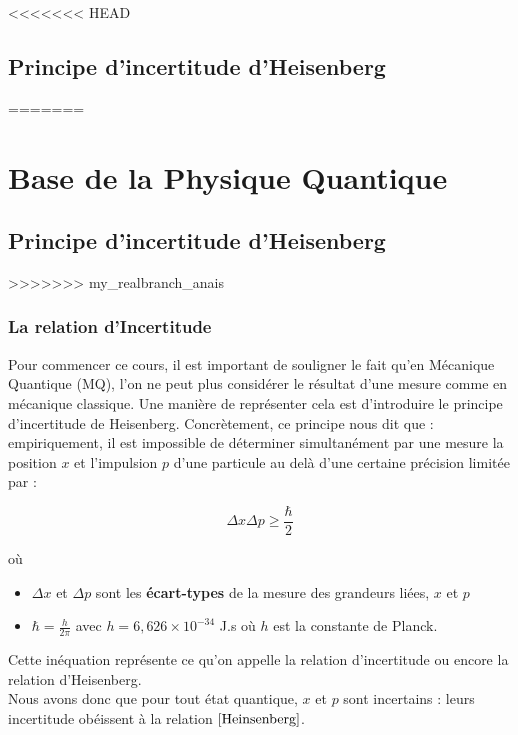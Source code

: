 \documentclass[../Notes de cours]{subfiles}
\begin{document}
<<<<<<< HEAD
\chapter{Principe d'incertitude d'Heisenberg}\label{chap:chap1}
=======
\part{Base de la Physique Quantique}

\chapter{Principe d'incertitude d'Heisenberg}
>>>>>>> my_realbranch_anais

\section{La relation d'Incertitude}
Pour commencer ce cours, il est important de souligner le fait qu'en Mécanique Quantique (MQ), l'on ne peut plus considérer le résultat d'une mesure comme en mécanique classique. 
Une manière de représenter cela est d'introduire le principe d'incertitude de Heisenberg. 
Concrètement, ce principe nous dit que : empiriquement, il est impossible de déterminer simultanément par une mesure la position $x$ et l'impulsion $p$ d'une particule au delà d'une certaine précision limitée par : 

\begin{equation}
\label{Heinsenberg}
\Delta x \Delta p \geq \frac{\hbar}{2}
\end{equation}

où 
\begin{itemize}[label = \textbullet]
	\item $\Delta x$ et $\Delta p$ sont les \textbf{écart-types} de la mesure des grandeurs liées, $x$ et $p$
	\item $\hbar = \frac{h}{2\pi}$ avec $h = 6,626 \times 10^{-34}$ J.s où $h$ est la constante de Planck. 
\end{itemize}


Cette inéquation représente ce qu'on appelle la relation d'incertitude ou encore la relation d'Heisenberg. \\
Nous avons donc que pour tout état quantique, $x$ et $p$ sont incertains : leurs incertitude obéissent à la relation $\ref{Heinsenberg}$. \\
\end{document}
